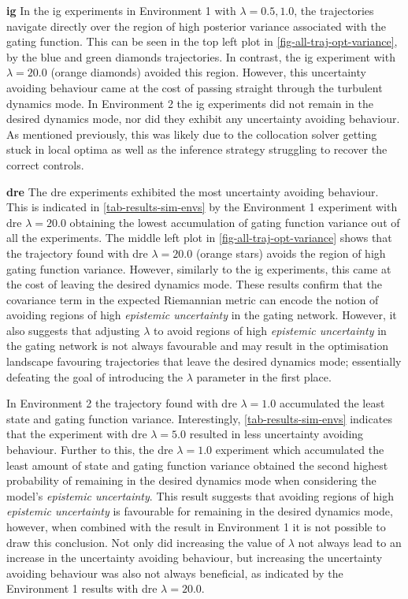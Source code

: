 \documentclass{mimosis-class/mimosis}
\numberwithin{equation}{chapter}
\begin{document}
{\textbf{\acrfull{ig}}
In the \acrshort{ig} experiments in Environment 1 with \(\lambda=0.5, 1.0\), the trajectories navigate
directly over the region of high posterior variance associated with the gating function.
This can be seen in the top left plot in \cref{fig-all-traj-opt-variance}, by the blue and green diamonds trajectories.
In contrast, the \acrshort{ig} experiment with \(\lambda=20.0\) (orange diamonds) avoided this region.
However, this uncertainty avoiding behaviour came at the cost
of passing straight through the turbulent dynamics mode.
In Environment 2 the \acrshort{ig} experiments did not remain in the desired dynamics mode, nor did they exhibit
any uncertainty avoiding behaviour.
As mentioned previously, this was likely due to the collocation solver getting stuck in local optima
as well as the inference strategy struggling to recover the correct controls.
\newline

\textbf{\acrfull{dre}}
The \acrshort{dre} experiments exhibited the most uncertainty avoiding behaviour.
This is indicated in \cref{tab-results-sim-envs} by the Environment 1 experiment with \acrshort{dre} \(\lambda=20.0\)
obtaining the lowest accumulation of gating function variance out of all the experiments.
The middle left plot in \cref{fig-all-traj-opt-variance}
shows that the trajectory found with \acrshort{dre} \(\lambda=20.0\) (orange stars)
avoids the region of high gating function variance.
However, similarly to the \acrshort{ig} experiments, this came at the cost of leaving the desired dynamics mode.
These results confirm that the covariance term in the expected Riemannian metric can encode the notion of avoiding
regions of high \emph{epistemic uncertainty} in the gating network.
However, it also suggests that adjusting \(\lambda\) to avoid regions of high \emph{epistemic uncertainty}
in the gating network is not always favourable and may result in the optimisation landscape favouring trajectories
that leave the desired dynamics mode;
essentially defeating the goal of introducing the \(\lambda\) parameter in the first place.

In Environment 2 the trajectory found with \acrshort{dre} \(\lambda=1.0\) accumulated the
least state and gating function variance.
Interestingly, \cref{tab-results-sim-envs} indicates that the experiment with \acrshort{dre} \(\lambda=5.0\)
resulted in less uncertainty avoiding behaviour.
Further to this, the \acrshort{dre} \(\lambda=1.0\) experiment which accumulated the least amount of state and gating
function variance obtained the second highest probability of remaining in the desired dynamics mode
when considering the model's \emph{epistemic uncertainty}.
This result suggests that avoiding regions of high \emph{epistemic uncertainty} is favourable for
remaining in the desired dynamics mode, however, when combined with the result in Environment 1 it is not possible
to draw this conclusion.
Not only did increasing the value of \(\lambda\) not always lead to an increase in the uncertainty avoiding
behaviour, but increasing the uncertainty avoiding behaviour was also not always beneficial,
as indicated by the Environment 1 results with \acrshort{dre} \(\lambda=20.0\).

}
\end{document}
